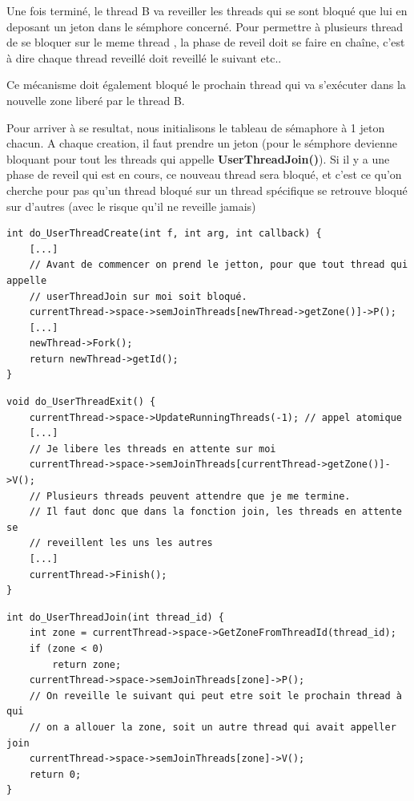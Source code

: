\documentclass[a4paper,10pt]{article}
\begin{document}
Une fois terminé, le thread B va reveiller les threads qui se sont bloqué que
lui en deposant un jeton dans le sémphore concerné.
Pour permettre à plusieurs thread de se bloquer sur le meme thread , la phase
de reveil doit se faire en chaîne, c'est à dire chaque thread reveillé doit
reveillé le suivant etc..

Ce mécanisme doit également bloqué le prochain thread qui va s'exécuter dans
la nouvelle zone liberé par le thread B.

Pour arriver à se resultat, nous initialisons le tableau de sémaphore à 1 jeton
chacun. A chaque creation, il faut prendre un jeton (pour le sémphore devienne
bloquant pour tout les threads qui appelle \textbf{UserThreadJoin()}). Si il y
a une phase de reveil qui est en cours, ce nouveau thread sera bloqué, et
c'est ce qu'on cherche pour pas qu'un thread bloqué sur un thread spécifique
se retrouve bloqué sur d'autres (avec le risque qu'il ne reveille jamais)

\begin{lstlisting}
int do_UserThreadCreate(int f, int arg, int callback) {
    [...]
    // Avant de commencer on prend le jetton, pour que tout thread qui appelle
    // userThreadJoin sur moi soit bloqué.
    currentThread->space->semJoinThreads[newThread->getZone()]->P();
    [...]
    newThread->Fork();
    return newThread->getId();
}
\end{lstlisting}

\begin{lstlisting}
void do_UserThreadExit() {
    currentThread->space->UpdateRunningThreads(-1); // appel atomique
    [...]
    // Je libere les threads en attente sur moi
    currentThread->space->semJoinThreads[currentThread->getZone()]->V();
    // Plusieurs threads peuvent attendre que je me termine.
    // Il faut donc que dans la fonction join, les threads en attente se
    // reveillent les uns les autres
    [...]
    currentThread->Finish();
}
\end{lstlisting}

\begin{lstlisting}
int do_UserThreadJoin(int thread_id) {
    int zone = currentThread->space->GetZoneFromThreadId(thread_id);
    if (zone < 0)
        return zone;
    currentThread->space->semJoinThreads[zone]->P();
    // On reveille le suivant qui peut etre soit le prochain thread à qui
    // on a allouer la zone, soit un autre thread qui avait appeller join
    currentThread->space->semJoinThreads[zone]->V();
    return 0;
}
\end{lstlisting}
\end{document}
